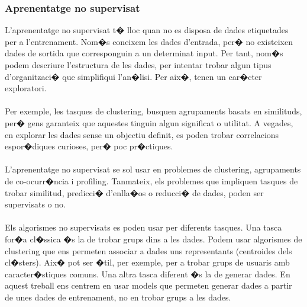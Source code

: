 \documentclass[12pt,a4paper,openright,oneside]{article}
\numberwithin{equation}{section}
\theoremstyle{definition}
\begin{document}
\subsubsection{Aprenentatge no supervisat}
L'aprenentatge no supervisat t� lloc quan no es disposa de dades etiquetades per a l'entrenament. Nom�s coneixem les dades d'entrada, per� no existeixen dades de sortida que corresponguin a un determinat input. Per tant, nom�s podem descriure l'estructura de les dades, per intentar trobar algun tipus d'organitzaci� que simplifiqui l'an�lisi. Per aix�, tenen un car�cter exploratori.
\\\\
Per exemple, les tasques de clustering, busquen agrupaments basats en similituds, per� gens garanteix que aquestes tinguin algun significat o utilitat. A vegades, en explorar les dades sense un objectiu definit, es poden trobar correlacions espor�diques curioses, per� poc pr�ctiques. \\\\
L'aprenentatge no supervisat se sol usar en problemes de clustering, agrupaments de co-ocurr�ncia i profiling. Tanmateix, els problemes que impliquen tasques de trobar similitud, predicci� d'enlla�os o reducci� de dades, poden ser supervisats o no.
\\\\
Els algorismes no supervisats es poden usar per diferents tasques. Una tasca for�a cl�ssica �s  la de trobar grups dins a les dades.  Podem usar algorismes de clustering que ens permeten associar a dades uns representants (centroides dels cl�sters). Aix� pot ser �til, per exemple, per a trobar grups de usuaris amb caracter�stiques comuns. 
Una altra tasca diferent �s la de generar dades. En aquest treball ens centrem en usar models que permeten generar dades a partir de unes dades de entrenament, no en trobar grups a les dades. 

\end{document}
